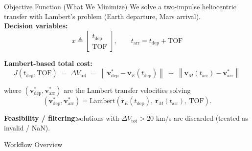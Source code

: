 \documentclass[aspectratio=169]{beamer}
\begin{document}
	\begin{frame}{Objective Function (What We Minimize)}
		\small
		We solve a two-impulse heliocentric transfer with Lambert's problem (Earth departure, Mars arrival).\\[0.5em]
		
		\textbf{Decision variables:}
		\[
		x \triangleq \begin{bmatrix} t_{\mathrm{dep}} \\ \mathrm{TOF} \end{bmatrix},
		\qquad
		t_{\mathrm{arr}} = t_{\mathrm{dep}} + \mathrm{TOF}
		\]
		
		\textbf{Lambert-based total cost:}
		\[
		J(t_{\mathrm{dep}}, \mathrm{TOF}) \;=\; \Delta V_{\mathrm{tot}}
		\;=\; \left\lVert \mathbf{v}^{\ast}_{\mathrm{dep}} - \mathbf{v}_{E}(t_{\mathrm{dep}})\right\rVert
		\;+\;
		\left\lVert \mathbf{v}_{M}(t_{\mathrm{arr}}) - \mathbf{v}^{\ast}_{\mathrm{arr}}\right\rVert
		\]
		
		where $(\mathbf{v}^{\ast}_{\mathrm{dep}}, \mathbf{v}^{\ast}_{\mathrm{arr}})$ are the Lambert transfer velocities solving
		\[
		(\mathbf{v}^{\ast}_{\mathrm{dep}}, \mathbf{v}^{\ast}_{\mathrm{arr}})
		= \mathrm{Lambert}\!\left(\mathbf{r}_{E}(t_{\mathrm{dep}}),\ \mathbf{r}_{M}(t_{\mathrm{arr}}),\ \mathrm{TOF}\right).
		\]
		
		\textbf{Feasibility / filtering:}\quad solutions with $\Delta V_{\mathrm{tot}} > 20$ km/s are discarded (treated as invalid / NaN).
	\end{frame}
	
	\begin{frame}{Workflow Overview}
		\centering
	\end{frame}
	
\end{document}
